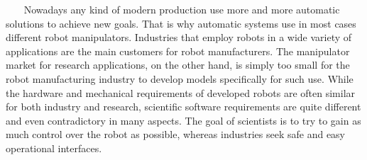 %
%
\setlength{\parindent}{1em}
   
Nowadays any kind of modern production use more and more automatic solutions to achieve new goals. That is why automatic systems use in most cases different robot manipulators. Industries that employ robots in a wide variety of applications are the main customers for robot manufacturers. The manipulator market for research applications, on the other hand, is simply too small for the robot manufacturing industry to develop models specifically for such use. While the hardware and mechanical requirements of developed robots are often similar for both industry and research, scientific software requirements are quite different and even contradictory in many aspects. The goal of scientists is to try to gain as much control over the robot as possible, whereas industries seek safe and easy operational interfaces. 

